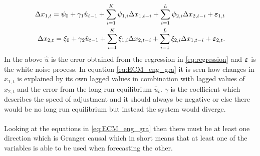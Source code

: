 \begin{align}\label{eq:ECM_eng_gra}
    \Delta x_{1,t}=\psi_0+\gamma_1\hat{u}_{t-1}+\sum^K_{i=1}\psi_{1,i}\Delta x_{1,t-i}+\sum^L_{i=1}\psi_{2,i}\Delta x_{2,t-i}+\boldsymbol{\varepsilon}_{1,t}\\
    \Delta x_{2,t}=\xi_0+\gamma_2\hat{u}_{t-1}+\sum^K_{i=1}\xi_{1,i}\Delta x_{2,t-i}+\sum^L_{i=1}\xi_{2,i}\Delta x_{1,t-i}+\boldsymbol{\varepsilon}_{2,t}.
\end{align}
In the above $\hat{u}$ is the error obtained from the regression in \eqref{eq:regression} and $\boldsymbol{\varepsilon}$ is the white noise process. In equation \eqref{eq:ECM_eng_gra} it is seen how changes in $x_{1,t}$ is explained by its own lagged values in combination with lagged values of $x_{2,t}$ and the error from the long run equilibrium $\hat{u}_t$. $\gamma$ is the coefficient which describes the speed of adjustment and it should always be negative or else there would be no long run equilibrium but instead the system would diverge.\\\\
Looking at the equations in \eqref{eq:ECM_eng_gra} then there must be at least one direction which is Granger causal which in short means that at least one of the variables is able to be used when forecasting the other.

\begin{comment}
    
\section{Johansen test}
As in the section above, where we introduced the procedure of the Engle-Granger test and how to use it for co-integration testing, this section is also regards a co-integration test. The Johansen test differs from the Engle-Granger test in the sense that it is able to estimate multiple cointegrating relations and is therefore not restricted to only pairwise co-integration relationships. The Johansen test is based on a VAR model of order $p$, VAR($p$), with $K$ time series where the error terms $\b{\b{\varepsilon}_t}$ are i.i.d normally distributed hence $\b{\b{\varepsilon}}\sim N_K(\b{0},\Sigma$. In general this approach desires to reduce information content from $T$ observations down to a lower dimension of $r$ which means there is $r$ co-integrating vectors. We construct $2K$ auxiliary regressions using OLS. The first $K$ regressions regresses $\Delta \b{x}_t$ with the lagged differences of $\b{y}_t$ as regressors. The residuals obtained from this regression is gathered in the matrix $R_{0,t}$. The other set of auxillery regressions regresses $\b{x}_{t-p}$ using the same regressors as before (lagged differences of $\b{x}_t$) and the residuals are collected in $R_{1,t}$. Next we construct a product moment matrix $\hat{S}_{i,j}$:
\begin{align}\label{eq:prod_moment_mat}
   \hat{S}_{i,j}=\frac{1}{T}\sum_{t=1}^T R_{0,t}R_{1,t}^T\;\;\;\; i,j=0,1.
\end{align}
Johansen has then shown that the likelihood-ratio test statistic of the null hypothesis \ref{tab:Various_Hypotheses}
\end{comment}
